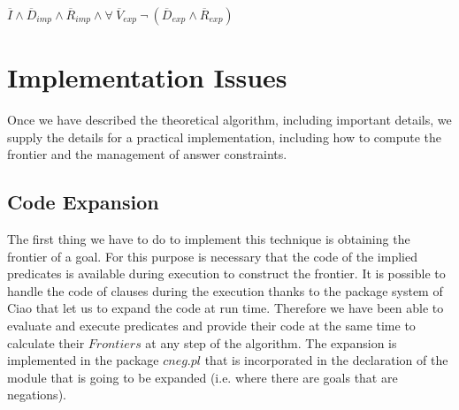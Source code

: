 \documentclass{llncs}
\begin{document}
\begin{itemize}
           $\overline{I} \wedge \overline{D}_{imp}
           \wedge \overline{R}_{imp} \wedge \forall~
           \overline{V}_{exp}~ \neg~(\overline{D}_{exp} \wedge
           \overline{R}_{exp})$ \\

         \end{itemize}


    


\section{Implementation Issues}
\label{implementation}

Once we have described the theoretical algorithm, including important
details, we supply the details for a practical implementation, including how
to compute the frontier and the management of answer constraints.


\subsection{Code Expansion}
\label{expansion}

The first thing we have to do to implement this technique is obtaining
the frontier of a goal. For this purpose is necessary that the code of
the implied predicates is available during execution to construct the
frontier. It is possible to handle the code of clauses during the
execution thanks to the package system of Ciao
\cite{ciao-modules-cl2000} that let us to expand the code at run time.
Therefore we have been able to evaluate and execute predicates and
provide their code at the same time to calculate their $Frontiers$ at
any step of the algorithm. The expansion is implemented in the package
$cneg.pl$ that is incorporated in the declaration of the module that
is going to be expanded (i.e. where there are goals that are
negations).
\end{document}
